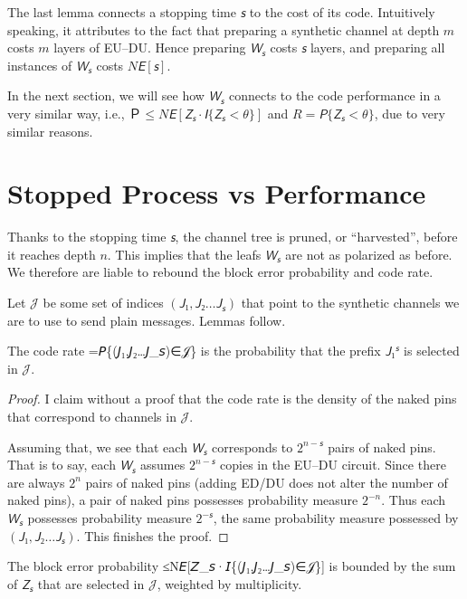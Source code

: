 \documentclass[openany]{amsbook}
\numberwithin{equation}{chapter}
\numberwithin{figure}{chapter}
\numberwithin{table}{chapter}
\def\[#1\]{\begin{equation*}{#1}\end{equation*}}
\theoremstyle{definition}	理dfn:Definition~?s			理exa:Example~?s
\theoremstyle{remark}		理cla:Claim~?s				理rem:Remark~?s
\begin{document}
	The last lemma connects a stopping time $𝘴$ to the cost of its code.
	Intuitively speaking, it attributes to the fact that
	preparing a synthetic channel at depth $m$ costs $m$ layers of EU--DU.
	Hence preparing $𝘞_𝘴$ costs $𝘴$ layers,
	and preparing all instances of $𝘞_𝘴$ costs $N𝘌[𝘴]$.
	
	In the next section, we will see how $𝘞_𝘴$ connects to the code performance
	in a very similar way, i.e., $Ｐ≤N𝘌[𝘡_𝘴·𝘐\{𝘡_𝘴<θ\}]$ and $R=𝘗\{𝘡_𝘴<θ\}$,
	due to very similar reasons.

\section{Stopped Process vs Performance}

	Thanks to the stopping time $𝘴$, the channel tree is pruned,
	or “harvested”, before it reaches depth $n$.
	This implies that the leafs $𝘞_𝘴$ are not as polarized as before.
	We therefore are liable to rebound the block error probability and code rate.
	
	Let $𝒥$ be some set of indices $(𝘑₁,𝘑₂…𝘑_𝘴)$ that point to
	the synthetic channels we are to use to send plain messages.
	Lemmas follow.
	
	\begin{lem}[$R$ in terms of $𝒥$]\label{lem:prune-R}
		The code rate
		\[R=𝘗\{(𝘑₁,𝘑₂…𝘑_𝘴)∈𝒥\}\]
		is the probability that the prefix $𝘑₁^𝘴$ is selected in $𝒥$.
	\end{lem}
	
	\begin{proof}
		I claim without a proof that the code rate is the density
		of the naked pins that correspond to channels in $𝒥$.
		
		Assuming that, we see that each $𝘞_𝘴$
		corresponds to $2^{n-𝘴}$ pairs of naked pins.
		That is to say, each $𝘞_𝘴$ assumes $2^{n-𝘴}$ copies in the EU--DU circuit.
		Since there are always $2^n$ pairs of naked pins
		(adding ED/DU does not alter the number of naked pins),
		a pair of naked pins possesses probability measure $2^{-n}$.
		Thus each $𝘞_𝘴$ possesses probability measure $2^{-𝘴}$,
		the same probability measure possessed by $(𝘑₁,𝘑₂…𝘑_𝘴)$.
		This finishes the proof.
	\end{proof}

	\begin{lem}[$Ｐ$ in terms of $𝒥$]\label{lem:prune-P}
		The block error probability
		\[Ｐ≤N𝘌[𝘡_𝘴·𝘐\{(𝘑₁,𝘑₂…𝘑_𝘴)∈𝒥\}]\]
		is bounded by the sum of $𝘡_𝘴$ that are
		selected in $𝒥$, weighted by multiplicity.
	\end{lem}
	
\end{document}
